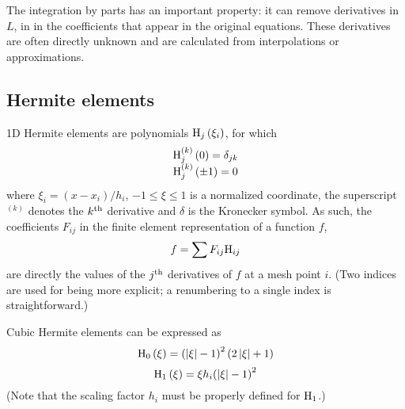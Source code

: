 The integration by parts has an important property: it can
remove derivatives in $L$, in in the coefficients that appear
in the original equations. These derivatives are often 
directly unknown and are calculated from interpolations or
approximations.

\subsection{Hermite elements} %
\label{ssub:hermite_elements}
1D Hermite elements are polynomials ${\rm H}_{j}\left(\xi_i\right)$,
for which
\begin{equation}
\begin{array}{*{20}{c}}
  {{\rm H} _{j}^{\left( k \right)}\left( 0 \right) = {\delta _{jk}}} \\ 
  {{\rm H} _{j}^{\left( k \right)}\left( { \pm 1} \right) = 0} 
\end{array}
\end{equation}
where $\xi_i=\left( x - x_i \right) / h_i$, $- 1 \leqslant \xi  \leqslant 1$ is a normalized coordinate,
the superscript $^{\left( k \right)}$ denotes the $k^{\rm th}$
derivative and $\delta$ is the Kronecker symbol.
As such, the coefficients $F_{ij}$ in the finite element representation of
a function $f$,
\begin{equation}
f = \sum {{F_{ij}}{{\rm H} _{ij}}} 
\end{equation}
are directly the values of the $j^{\rm th}$
derivatives of $f$ at a mesh point $i$.
(Two indices are used for being more explicit; a renumbering
to a single index is straightforward.)

Cubic Hermite elements can be expressed as
\begin{equation}
{{\rm H}_0}\left( \xi  \right) = {\left( {\left| \xi  \right| - 1} \right)^2}\left( {2\left| \xi  \right| + 1} \right)
\end{equation}
\begin{equation}
{{\rm H}_1}\left( \xi  \right) = \xi {h_i}{\left( {\left| \xi  \right| - 1} \right)^2}
\end{equation}
(Note that the scaling factor $h_i$ must be properly defined for
${\rm H}_1$.)

